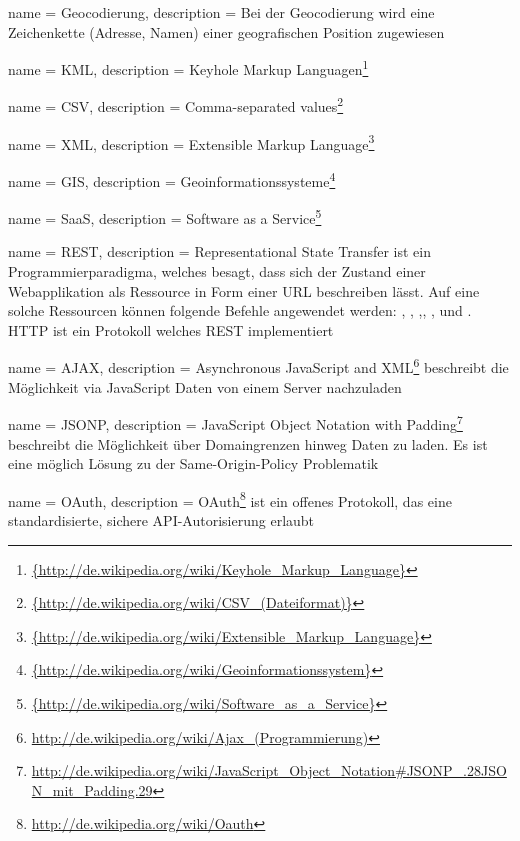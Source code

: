  {
	name = Geocodierung,
	description = {Bei der Geocodierung wird eine Zeichenkette (Adresse, Namen) einer geografischen Position zugewiesen}
}

 {
	name = KML,
	description = {Keyhole Markup Languagen\footnote{\url{{http://de.wikipedia.org/wiki/Keyhole_Markup_Language}}}}
}

 {
	name = CSV,
	description = {Comma-separated values\footnote{\url{{http://de.wikipedia.org/wiki/CSV_(Dateiformat)}}}}
}

 {
	name = XML,
	description = {Extensible Markup Language\footnote{\url{{http://de.wikipedia.org/wiki/Extensible_Markup_Language}}}}
}

 {
	name = GIS,
	description = {Geoinformationssysteme\footnote{\url{{http://de.wikipedia.org/wiki/Geoinformationssystem}}}}
}

 {
	name = SaaS,
	description = {Software as a Service\footnote{\url{{http://de.wikipedia.org/wiki/Software_as_a_Service}}}}
}

 {
	name = REST,
	description = {Representational State Transfer\cite{rest} ist ein Programmierparadigma, welches besagt, dass sich der Zustand einer Webapplikation als Ressource in Form einer URL beschreiben lässt. Auf eine solche Ressourcen können folgende Befehle angewendet werden: , , ,, ,  und . HTTP ist ein Protokoll welches REST implementiert}
}

 {
	name = AJAX,
	description = {Asynchronous JavaScript and XML\footnote{\url{http://de.wikipedia.org/wiki/Ajax_(Programmierung)}} beschreibt die Möglichkeit via JavaScript Daten von einem Server nachzuladen}
}

 {
	name = JSONP,
	description = {JavaScript Object Notation with Padding\footnote{\url{http://de.wikipedia.org/wiki/JavaScript_Object_Notation\#JSONP_.28JSON_mit_Padding.29}} beschreibt die Möglichkeit über Domaingrenzen hinweg Daten zu laden. Es ist eine möglich Lösung zu der Same-Origin-Policy Problematik\cite{sop}}
}

 {
	name = OAuth,
	description = {OAuth\footnote{\url{http://de.wikipedia.org/wiki/Oauth}} ist ein offenes Protokoll, das eine standardisierte, sichere API-Autorisierung erlaubt}
}


